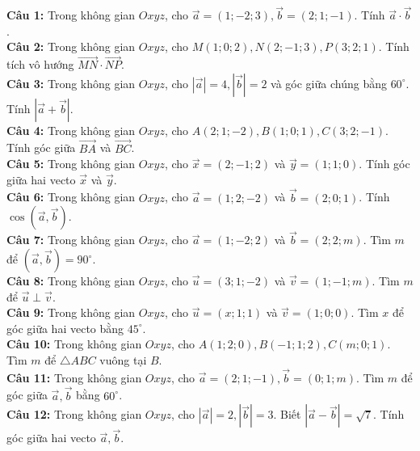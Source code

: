 \documentclass[12pt]{article}
\begin{document}
	\begin{btvang}
		\noindent \textbf{Câu 1:} Trong không gian $Oxyz$, cho $\vec{a} = (1; -2; 3), \vec{b} = (2; 1; -1)$. Tính $\vec{a} \cdot \vec{b}$. \\
		\noindent \textbf{Câu 2:} Trong không gian $Oxyz$, cho $M(1; 0; 2), N(2; -1; 3), P(3; 2; 1)$. Tính tích vô hướng $\vec{MN} \cdot \vec{NP}$. \\
		\noindent \textbf{Câu 3:} Trong không gian $Oxyz$, cho $|\vec{a}| = 4, |\vec{b}| = 2$ và góc giữa chúng bằng $60^\circ$. Tính $|\vec{a} + \vec{b}|$. \\
		\noindent \textbf{Câu 4:} Trong không gian $Oxyz$, cho $A(2; 1; -2), B(1; 0; 1), C(3; 2; -1)$. Tính góc giữa $\vec{BA}$ và $\vec{BC}$. \\
		\noindent \textbf{Câu 5:} Trong không gian $Oxyz$, cho $\vec{x} = (2; -1; 2)$ và $\vec{y} = (1; 1; 0)$. Tính góc giữa hai vecto $\vec{x}$ và $\vec{y}$. \\
		\noindent \textbf{Câu 6:} Trong không gian $Oxyz$, cho $\vec{a} = (1; 2; -2)$ và $\vec{b} = (2; 0; 1)$. Tính $\cos(\vec{a}, \vec{b})$. \\
		\noindent \textbf{Câu 7:} Trong không gian $Oxyz$, cho $\vec{a} = (1; -2; 2)$ và $\vec{b} = (2; 2; m)$. Tìm $m$ để $(\vec{a}, \vec{b}) = 90^\circ$. \\
		\noindent \textbf{Câu 8:} Trong không gian $Oxyz$, cho $\vec{u} = (3; 1; -2)$ và $\vec{v} = (1; -1; m)$. Tìm $m$ để $\vec{u} \perp \vec{v}$. \\
		\noindent \textbf{Câu 9:} Trong không gian $Oxyz$, cho $\vec{u} = (x; 1; 1)$ và $\vec{v} = (1; 0; 0)$. Tìm $x$ để góc giữa hai vecto bằng $45^\circ$. \\
		\noindent \textbf{Câu 10:} Trong không gian $Oxyz$, cho $A(1; 2; 0), B(-1; 1; 2), C(m; 0; 1)$. Tìm $m$ để $\triangle ABC$ vuông tại $B$. \\
		\noindent \textbf{Câu 11:} Trong không gian $Oxyz$, cho $\vec{a} = (2; 1; -1), \vec{b} = (0; 1; m)$. Tìm $m$ để góc giữa $\vec{a}, \vec{b}$ bằng $60^\circ$. \\
		\noindent \textbf{Câu 12:} Trong không gian $Oxyz$, cho $|\vec{a}| = 2, |\vec{b}| = 3$. Biết $|\vec{a} - \vec{b}| = \sqrt{7}$. Tính góc giữa hai vecto $\vec{a}, \vec{b}$.
	\end{btvang}
	
\end{document}
